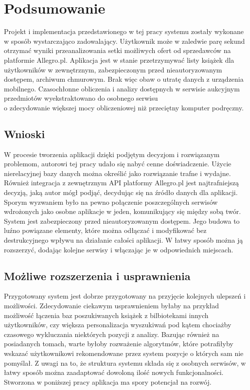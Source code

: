 \chapter{Podsumowanie}
\label{cha:podsumowanie}

Projekt i implementacja przedstawionego w tej pracy systemu zostały wykonane\\w sposób wystarczająco zadowalający. Użytkownik może w zaledwie parę sekund otrzymać wyniki przeanalizowania setki możliwych ofert od sprzedawców na platformie Allegro.pl. Aplikacja jest w stanie przetrzymywać listy książek dla użytkowników w zewnętrznym, zabezpieczonym przed nieautoryzowanym dostępem, archiwum chmurowym. Brak więc obaw o utratę danych z urządzenia mobilnego. Czasochłonne obliczenia i analizy dostępnych w serwisie aukcyjnym przedmiotów wyekstraktowano do osobnego serwisu\\o zdecydowanie większej mocy obliczeniowej niż przeciętny komputer podręczny.

\section{Wnioski}
W procesie tworzenia aplikacji dzięki podjętym decyzjom i rozwiązanym problemom, autorowi tej pracy udało się nabyć cenne doświadczenie. 
Użycie nierelacyjnej bazy danych można określić jako rozwiązanie trafne i wydajne. Również integracja z zewnętrznym API platformy Allegro.pl jest najtrafniejszą decyzją, jaką autor mógł podjąć, decydując się na źródło danych dla aplikacji.\newline
Sporym wyzwaniem było na pewno połączenie poszczególnych serwisów wdrożonych jako osobne aplikacje w jeden, komunikujący się między sobą twór.\newline
System jest zabezpieczony przed nieautoryzowanym dostępem. Jego budowa to luźno powiązane elementy, które można odłączać i modyfikować bez destrukcyjnego wpływu na działanie całości aplikacji.
W łatwy sposób można ją rozszerzyć, dodając kolejne serwisy i włączając je w odpowiednich miejscach.

\newpage
\section{Możliwe rozszerzenia i usprawnienia}
Przygotowany system jest dobrze przygotowany na przyjęcie kolejnych ulepszeń i możliwości.\newline
Zdecydowanie ciekawym usprawnieniem byłaby na przykład możliwość łączenia baz poszukiwanych książek z bilbiotekami innych użytkowników, czy większa personalizacja wyszukiwań pod kątem chociażby czasowego wykluczania niektórych pozycji z analizy.\newline
Bazując również na posiadanych tomach, warte byłoby rozważenie algorytmów, które potrafiłyby wskazać użytkownikowi rekomendowane przez system pozycje o których sam nie pomyślał.
Z uwagi na to, że struktura systemu składa się z osobnych serwisów, w łatwy sposób można zaadaptować dowoloną ilość nowych funkcjonalności. Stworzona w poniższej pracy aplikacja ma spory potencjał na rozwój.